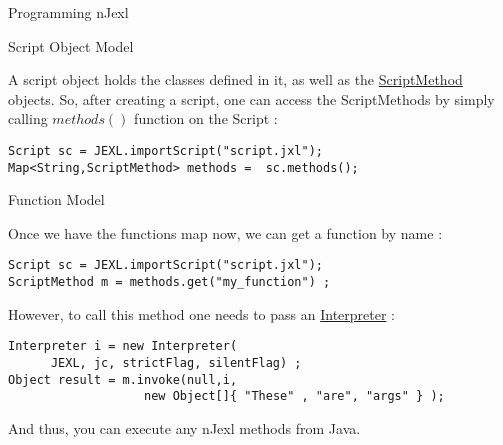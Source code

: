 \begin{section}{Programming nJexl}

\begin{subsection}{Script Object Model}


A script object holds the classes defined in it, 
as well as the \href{https://github.com/nmondal/njexl/blob/master/lang/src/main/java/com/noga/njexl/lang/extension/oop/ScriptMethod.java}{ScriptMethod} objects. So, after creating a script, one can access the ScriptMethods by simply calling $methods()$
function on the Script :

\begin{lstlisting}[style=myJavaStyle]
Script sc = JEXL.importScript("script.jxl");
Map<String,ScriptMethod> methods =  sc.methods();
\end{lstlisting} 

\end{subsection}

\begin{subsection}{Function Model}

Once we have the functions map now, we can get a function by name :

\begin{lstlisting}[style=myJavaStyle]
Script sc = JEXL.importScript("script.jxl");
ScriptMethod m = methods.get("my_function") ;
\end{lstlisting} 

However, to call this method one needs to pass an 
\href{https://github.com/nmondal/njexl/blob/master/lang/src/main/java/com/noga/njexl/lang/Interpreter.java}{Interpreter} :

\begin{lstlisting}[style=myJavaStyle]
Interpreter i = new Interpreter(
      JEXL, jc, strictFlag, silentFlag) ;
Object result = m.invoke(null,i,
                   new Object[]{ "These" , "are", "args" } );
\end{lstlisting} 

And thus, you can execute any nJexl methods from Java.
\end{subsection}

\end{section}

